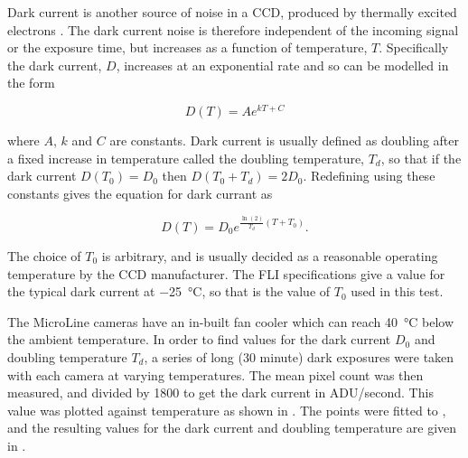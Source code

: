 \begin{colsection}
\begin{colsection}
Dark current is another source of noise in a CCD, produced by thermally excited electrons \citep{dark_current}. The dark current noise is therefore independent of the incoming signal or the exposure time, but increases as a function of temperature, $T$. Specifically the dark current, $D$, increases at an exponential rate and so can be modelled in the form

\begin{equation}
    D(T) = Ae^{kT + C}
    \label{eq:dark_model}
\end{equation}

where $A$, $k$ and $C$ are constants. Dark current is usually defined as doubling after a fixed increase in temperature called the doubling temperature, $T_d$, so that if the dark current $D(T_0) = D_0$ then $D(T_0 + T_d) = 2D_0$. Redefining  using these constants gives the equation for dark currant as

\begin{equation}
    D(T) = D_0 e^{\frac{\ln(2)}{T_d}(T + T_0)}.
    \label{eq:dc}
\end{equation}

The choice of $T_0$ is arbitrary, and is usually decided as a reasonable operating temperature by the CCD manufacturer. The FLI specifications give a value for the typical dark current at \SI{-25}{\celsius}, so that is the value of $T_0$ used in this test.

The MicroLine cameras have an in-built fan cooler which can reach \SI{40}{\celsius} below the ambient temperature. In order to find values for the dark current $D_0$ and doubling temperature $T_d$, a series of long (30 minute) dark exposures were taken with each camera at varying temperatures. The mean pixel count was then measured, and divided by 1800 to get the dark current in ADU/second. This value was plotted against temperature as shown in . The points were fitted to , and the resulting values for the dark current and doubling temperature are given in .

\newpage


\end{colsection}
\end{colsection}
